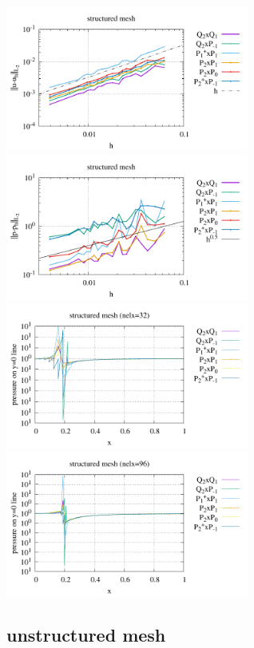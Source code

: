 \begin{center}
\includegraphics[width=8cm]{python_codes/fieldstone_120/paperresults/solvi_structured_errorsV.pdf}
\includegraphics[width=8cm]{python_codes/fieldstone_120/paperresults/solvi_structured_errorsP.pdf}\\
\includegraphics[width=8cm]{python_codes/fieldstone_120/paperresults/solvi_p_profile_structured_32.pdf}
\includegraphics[width=8cm]{python_codes/fieldstone_120/paperresults/solvi_p_profile_structured_96.pdf}
\end{center}


\subsection*{unstructured mesh}

